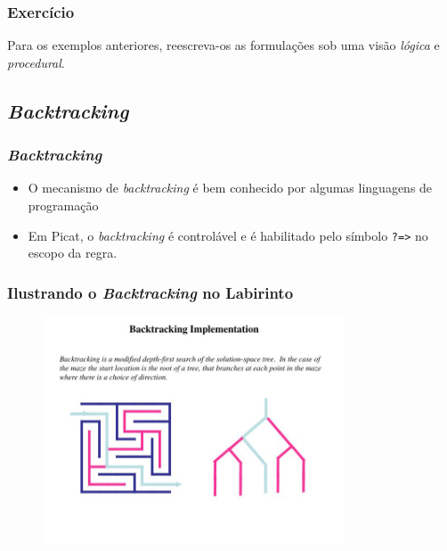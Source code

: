 \begin{frame}[fragile]

\frametitle{Exercício}

Para os exemplos anteriores, reescreva-os
as formulações sob uma visão
\textit{lógica} e  \textit{procedural}.

\end{frame}



\subsection{\textit{Backtracking}}
\begin{frame}[fragile]

\frametitle{\textit{Backtracking}}
\begin{itemize}
  \item O mecanismo de \textit{backtracking} é bem conhecido por algumas linguagens de programação

  
  \pause 
  \item Em Picat, o \textit{backtracking} é controlável e é habilitado pelo símbolo
  \verb!?=>! no escopo da regra. 

\end{itemize}

\end{frame}

\begin{frame}[fragile]
\frametitle{Ilustrando o \textit{Backtracking} no Labirinto}

\begin{figure}[!htb]
\begin{center}
\includegraphics[width=0.80\textwidth, height=0.90\textheight]{figures/ilustra_backtracking_01.jpg}
\end{center}
\end{figure}
\end{frame}

